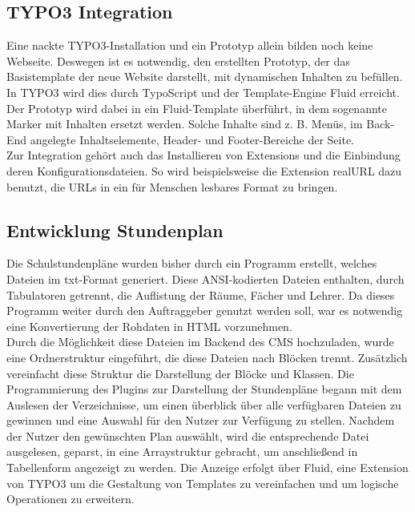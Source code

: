 \subsection{TYPO3 Integration}
\label{sec:TYPO3 Integration}
Eine nackte TYPO3-Installation und ein Prototyp allein bilden noch keine Webseite. Deswegen ist es notwendig, den erstellten 
Prototyp, der das Basistemplate der neue Website darstellt, mit dynamischen Inhalten zu befüllen. In TYPO3 wird dies durch 
TypoScript und der Template-Engine Fluid erreicht. Der Prototyp wird dabei in ein Fluid-Template überführt, in dem sogenannte 
Marker mit Inhalten ersetzt werden. Solche Inhalte sind z. B. Menüs, im Back-End angelegte Inhaltselemente, Header- und 
Footer-Bereiche der Seite.\\
Zur Integration gehört auch das Installieren von Extensions und die Einbindung deren Konfigurationsdateien. So wird 
beispielsweise die Extension realURL dazu benutzt, die URLs in ein für Menschen lesbares Format zu bringen.

\subsection{Entwicklung Stundenplan}
\label{sec:Entwicklung Stundenplan}
Die Schulstundenpl\"ane wurden bisher durch ein Programm erstellt, welches 
Dateien im txt-Format generiert. Diese \acs{ANSI}-kodierten Dateien enthalten, 
durch Tabulatoren getrennt, die Auflistung der R\"aume, F\"acher und Lehrer.
Da dieses Programm weiter durch den Auftraggeber genutzt werden soll, war 
es notwendig eine Konvertierung der Rohdaten in \acs{HTML} vorzunehmen.\\
Durch die M\"oglichkeit diese Dateien im Backend des \acs{CMS} hochzuladen, wurde eine 
Ordnerstruktur eingef\"uhrt, die diese Dateien nach Bl\"ocken trennt. 
Zus\"atzlich vereinfacht diese Struktur die Darstellung der Bl\"ocke und Klassen. Die Programmierung 
des Plugins zur Darstellung der Stundenpl\"ane begann mit dem Auslesen der Verzeichnisse, um einen 
\"uberblick \"uber alle verf\"ugbaren Dateien zu gewinnen und eine Auswahl f\"ur den Nutzer zur Verf\"ugung 
zu stellen. Nachdem der Nutzer den gew\"unschten Plan ausw\"ahlt, wird die entsprechende Datei 
ausgelesen, \acs{geparst}, in eine \acs{Array}struktur gebracht, um anschlie\ss{}end in Tabellenform angezeigt 
zu werden. Die Anzeige erfolgt \"uber Fluid, eine Extension von TYPO3 um die Gestaltung von Templates 
zu vereinfachen und um logische Operationen zu erweitern.


